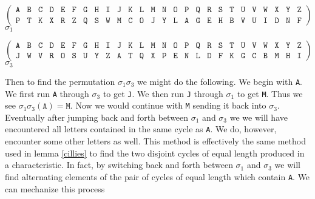 \begin{center}
	\[
		\left(
		\begin{array}{llllllllllllllllllllllllll}
				\texttt{A} & \texttt{B} & \texttt{C} & \texttt{D} &
				\texttt{E} & \texttt{F} & \texttt{G} & \texttt{H} &
				\texttt{I} & \texttt{J} & \texttt{K} & \texttt{L} &
				\texttt{M} & \texttt{N} & \texttt{O} & \texttt{P} &
				\texttt{Q} & \texttt{R} & \texttt{S} & \texttt{T} &
				\texttt{U} & \texttt{V} & \texttt{W} & \texttt{X} &
				\texttt{Y} & \texttt{Z}                             \\
				\texttt{P} & \texttt{T} & \texttt{K} & \texttt{X} &
				\texttt{R} & \texttt{Z} & \texttt{Q} & \texttt{S} &
				\texttt{W} & \texttt{M} & \texttt{C} & \texttt{O} &
				\texttt{J} & \texttt{Y} & \texttt{L} & \texttt{A} &
				\texttt{G} & \texttt{E} & \texttt{H} & \texttt{B} &
				\texttt{V} & \texttt{U} & \texttt{I} & \texttt{D} &
				\texttt{N} & \texttt{F}
			\end{array}
		\right)
	\]
	$\sigma_1$
\end{center}
\begin{center}
	\[
		\left(
		\begin{array}{llllllllllllllllllllllllll}
				\texttt{A} & \texttt{B} & \texttt{C} & \texttt{D} &
				\texttt{E} & \texttt{F} & \texttt{G} & \texttt{H} &
				\texttt{I} & \texttt{J} & \texttt{K} & \texttt{L} &
				\texttt{M} & \texttt{N} & \texttt{O} & \texttt{P} &
				\texttt{Q} & \texttt{R} & \texttt{S} & \texttt{T} &
				\texttt{U} & \texttt{V} & \texttt{W} & \texttt{X} &
				\texttt{Y} & \texttt{Z}                             \\
				\texttt{J} & \texttt{W} & \texttt{V} & \texttt{R} &
				\texttt{O} & \texttt{S} & \texttt{U} & \texttt{Y} &
				\texttt{Z} & \texttt{A} & \texttt{T} & \texttt{Q} &
				\texttt{X} & \texttt{P} & \texttt{E} & \texttt{N} &
				\texttt{L} & \texttt{D} & \texttt{F} & \texttt{K} &
				\texttt{G} & \texttt{C} & \texttt{B} & \texttt{M} &
				\texttt{H} & \texttt{I}
			\end{array}
		\right)
	\]
	$\sigma_3$
\end{center}
Then to find the permutation $\sigma_1\sigma_3$ we might do the following. We begin with \texttt{A}. We first run \texttt{A} through $\sigma_3$ to get \texttt{J}. We then run \texttt{J} through $\sigma_1$ to get \texttt{M}. Thus we see $\sigma_1\sigma_3(\texttt{A}) = \texttt{M}$. Now we would continue with \texttt{M} sending it back into $\sigma_3$. Eventually after jumping back and forth between $\sigma_1$ and $\sigma_3$ we we will have encountered all letters contained in the same cycle as \texttt{A}. We do, however, encounter some other letters as well. This method is effectively the same method used in lemma \ref{cillies} to find the two disjoint cycles of equal length produced in a characteristic. In fact, by switching back and forth between $\sigma_1$ and $\sigma_3$ we will find alternating elements of the pair of cycles of equal length which contain \texttt{A}. We can mechanize this process
